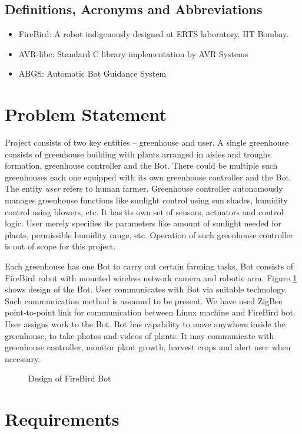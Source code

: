 \documentclass[a4paper, 12pt]{article}
\begin{document}
\subsection{Definitions, Acronyms and Abbreviations}
\begin{itemize}
 \item FireBird: A robot indigenously designed at ERTS laboratory, IIT Bombay. \cite{fbhwmanual, fbswmanual, eyantra}
 \item AVR-libc: Standard C library implementation by AVR Systems
 \item ABGS: Automatic Bot Guidance System
\end{itemize}

\section{Problem Statement}
Project consists of two key entities -- greenhouse and user. A single greenhouse consists of greenhouse building with
plants arranged in aisles and troughs formation, greenhouse controller and the Bot. There could be multiple such 
greenhouses each one equipped with its own greenhouse controller and the Bot. The entity \emph{user} refers to human farmer.
Greenhouse controller autonomously manages greenhouse functions like sunlight control using sun shades, humidity control using
blowers, etc. It has its own set of sensors, actuators and control logic. User merely specifies its parameters 
like amount of sunlight needed for plants, permissible humidity range, etc. Operation of such greenhouse 
controller is out of scope for this project.

Each greenhouse has one Bot to carry out certain farming tasks. Bot consists of FireBird robot with mounted 
wireless network camera and robotic arm. Figure \ref{fig-bot} shows design of the Bot.
User communicates with Bot via suitable technology. Such communication method is assumed to be 
present. We have used ZigBee point-to-point link for communication between Linux machine and FireBird bot.
User assigns work to the Bot. Bot has capability to move anywhere inside the greenhouse, to take photos and 
videos of plants. It may communicate with greenhouse controller, monitor plant growth, harvest crops and 
alert user when necessary.

\begin{figure}

\caption{Design of FireBird Bot}
\label{fig-bot}
\end{figure}

\section{Requirements}
\end{document}
